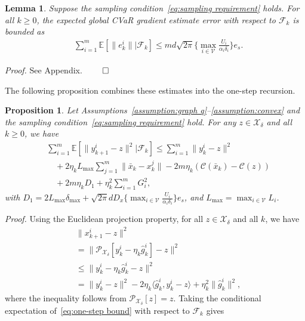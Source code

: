 \documentclass[twocolumn]{autart}    %
\newcommand{\brk}[1]{\left[#1\right]}
\newtheorem{lemma}{Lemma}
\newtheorem{proposition}{Proposition}
\newcommand{\1}{\mathbf{1}}
\begin{document}
\begin{lemma}\label{lemma:cvar gradient error}
Suppose the sampling condition~\eqref{eq:sampling requirement} holds. 
For all $k \ge 0$, the expected global CVaR gradient estimate error with respect to $\mathcal{F}_k$ is bounded as 
\begin{align}\label{eq:cvar gradient error sum}
    &  \sum_{i=1}^m \mathbb{E} \brk{  \|e_k^i\| \big| \mathcal{F}_k  }    \le   
    md\sqrt{ 2\pi }\Big\{\max_{i\in \mathcal{V}} \frac{U_i}{\alpha_i\delta_i}\Big\} e_s.   
\end{align}
\end{lemma}
\textit{Proof.} See Appendix. 
\hfill $\qed$

The following proposition combines these estimates into the one-step recursion.
\begin{proposition}
Let Assumptions~\ref{assumption:graph q}--\ref{assumption:convex}  
and the sampling condition~\eqref{eq:sampling requirement} hold. 
For any  $z \in \mathcal{X}_{\delta}$ and all $k\ge 0$, we have
\begin{align}\label{eq:iterate relation filtration}
 &\sum_{i=1}^m  \mathbb{E}\left[\|y_{k+1}^i-z\|^2 | \mathcal{F}_k \right] \le   \sum_{i=1}^m    \|y_k^i-z\|^{2} \nonumber \\ 
&\quad  + 2\eta_kL_{\max}\sum_{j=1}^{m}\|\bar{x}_k-x_k^j\|  -2m\eta_k(\mathcal{C}(\bar{x}_k)-\mathcal{C}(z)) \nonumber \\
& \quad +  2m\eta_k D_1   
+\eta_k^{2}  \sum_{i=1}^m G_i^2,  
\end{align}
with $ D_1 =  2L_{\max}\delta_{\max}+  \sqrt{ 2\pi } dD_x\Big\{\max_{i\in \mathcal{V}} \frac{U_i}{\alpha_i\delta_i}\Big\} e_s$, 
and $L_{\max} = \max_{i \in \mathcal{V}}L_i$. 
\end{proposition}
\textit{Proof.}
Using the Euclidean projection property, for all $z \in \mathcal{X}_\delta$ and all $k$, we have 
\begin{align}\label{eq:one-step bound}
& \|x_{k+1}^i-z\|^{2} \nonumber \\
&=\| \mathcal{P}_{\mathcal{X}_\delta} \left[y_k^i-\eta_k\hat{g}_k^i\right]-z\|^{2} \nonumber \\
&\le \| y_k^i-\eta_k\hat{g}_k^i -z\|^{2} \nonumber \\
&= \|y_k^i-z\|^{2}-2 \eta_k \langle \hat{g}_k^i,y_k^i-z\rangle +\eta_k^{2}\|\hat{g}_k^i\|^{2},  
\end{align}
 where the inequality follows from $\mathcal{P}_{\mathcal{X}_\delta}[z] = z$.
Taking the conditional expectation of~\eqref{eq:one-step bound} with respect to $\mathcal F_k$ gives
\end{document}
